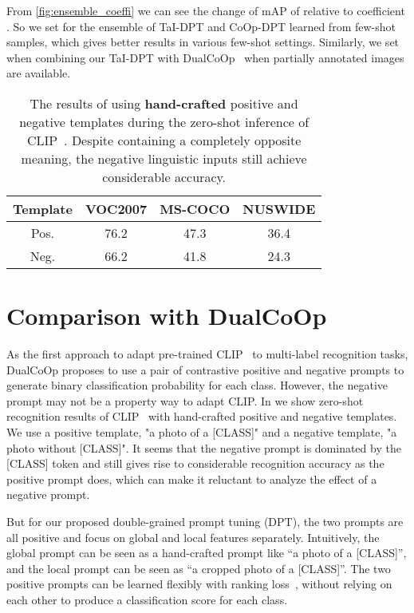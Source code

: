 \documentclass[10pt,twocolumn,letterpaper]{article}
\begin{document}
From \cref{fig:ensemble_coeffi} we can see the change of mAP of  relative to coefficient .
So we set  for the ensemble of TaI-DPT and CoOp-DPT learned from few-shot samples, which gives better results in various few-shot settings. Similarly, we set  when combining our TaI-DPT with DualCoOp~\cite{dualcoop} when partially annotated images are available.

\begin{table}
    \centering
    \caption{The results of using \textbf{hand-crafted} positive and negative templates during the zero-shot inference of CLIP~\cite{clip}. Despite containing a completely opposite meaning, the negative linguistic inputs still achieve considerable accuracy.}
    \vspace{-2mm}
    \setlength{\tabcolsep}{3mm}
    \begin{tabular}{c|ccc}
    \toprule
Template & VOC2007 & MS-COCO & NUSWIDE  \\ \hline
Pos. & 76.2 & 47.3 & 36.4  \\ 
Neg. & 66.2 & 41.8 & 24.3  \\ 
    \bottomrule
    \end{tabular}
  \label{tab:neg}
\end{table}

\section{Comparison with DualCoOp}
\label{sec:dualcoop}
As the first approach to adapt pre-trained CLIP~\cite{clip} to multi-label recognition tasks, DualCoOp\cite{dualcoop} proposes to use a pair of contrastive positive and negative prompts to generate binary classification probability for each class. However, the negative prompt may not be a property way to adapt CLIP. In  we show zero-shot recognition results of CLIP~\cite{clip} with hand-crafted positive and negative templates. We use a positive template, "a photo of a [CLASS]" and a negative template, "a photo without [CLASS]". It seems that the negative prompt is dominated by the [CLASS] token and still gives rise to considerable recognition accuracy as the positive prompt does, which can make it reluctant to analyze the effect of a negative prompt.

But for our proposed double-grained prompt tuning (DPT), the two prompts are all positive and focus on global and local features separately. Intuitively, the global prompt can be seen as a hand-crafted prompt like ``a photo of a [CLASS]'', and the local prompt can be seen as ``a cropped photo of a [CLASS]''. The two positive prompts can be learned flexibly with ranking loss~\cite{rankingloss}, without relying on each other to produce a classification score for each class. 
\end{document}
